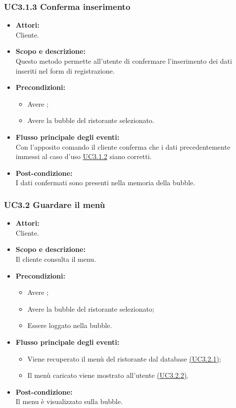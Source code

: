 \subsubsection{UC3.1.3 Conferma inserimento} \label{UC3.1.3}

\begin{itemize}
	\item \textbf{Attori:}
	\\Cliente.
	\item \textbf{Scopo e descrizione:} 
	\\Questo metodo permette all’utente di confermare l’inserimento dei dati inseriti nel form di registrazione.
	\item \textbf{Precondizioni:}
	\begin{itemize}
		\item Avere ;
		\item Avere la bubble del ristorante selezionato.
	\end{itemize}
	\item \textbf{Flusso principale degli eventi:}
	\\Con l’apposito comando il cliente conferma che i dati precedentemente immessi al caso d’uso \hyperref[UC3.1.2]{UC3.1.2} siano corretti.
	\item \textbf{Post-condizione:}
	\\I dati confermati sono presenti nella memoria della bubble.
\end{itemize}

\subsubsection{UC3.2 Guardare il menù} \label{UC3.2}

\begin{itemize}
	\item \textbf{Attori:}
	\\Cliente.
	\item \textbf{Scopo e descrizione:} 
	\\Il cliente consulta il menu.
	\item \textbf{Precondizioni:}
	\begin{itemize}
		\item Avere ;
		\item Avere la bubble del ristorante selezionato;
		\item Essere loggato nella bubble.
	\end{itemize}
	\item \textbf{Flusso principale degli eventi:}
	\begin{itemize}
		\item Viene recuperato il menù del ristorante dal database \hyperref[UC3.2.1]{(UC3.2.1)};
		\item Il menù caricato viene mostrato all’utente \hyperref[UC3.2.2]{(UC3.2.2)}.
	\end{itemize}
	\item \textbf{Post-condizione:}
	\\Il menu è visualizzato sulla bubble.
\end{itemize}

